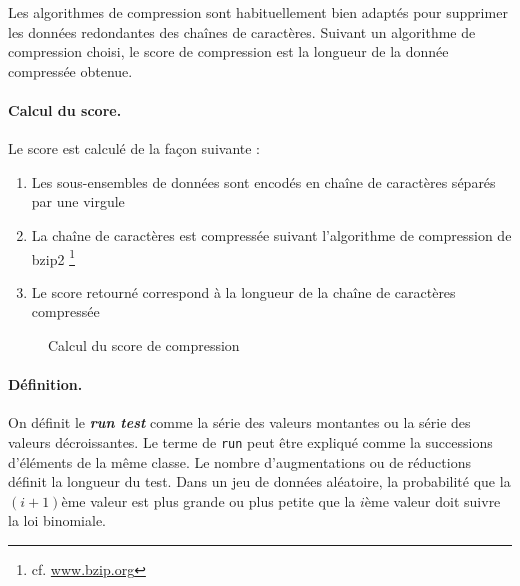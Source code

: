 Les algorithmes de compression sont habituellement bien adaptés pour supprimer les données redondantes des chaînes de caractères. Suivant un algorithme de compression choisi, le score de compression est la longueur de la donnée compressée obtenue. 

\paragraph{Calcul du score.\\}
Le score est calculé de la façon suivante :
\begin{enumerate}
\item Les sous-ensembles de données sont encodés en chaîne de caractères séparés par une virgule
\item La chaîne de caractères est compressée suivant l'algorithme de compression de bzip2 \footnote{cf. \url{www.bzip.org}}
\item Le score retourné correspond à la longueur de la chaîne de caractères compressée
\end{enumerate}

\begin{figure}[H]
\begin{center}
\end{center}
\caption{Calcul du score de compression}
\end{figure}

\paragraph{Définition.\\}
On définit le \textbf{\textit{run test}} comme la série des valeurs montantes ou la série des valeurs décroissantes. Le terme de \texttt{run} peut être expliqué comme la successions d'éléments de la même classe. Le nombre d'augmentations ou de réductions définit la longueur du test. Dans un jeu de données aléatoire, la probabilité que la $(i+1)$ème valeur est plus grande ou plus petite que la $i$ème valeur doit suivre la loi binomiale.\\


